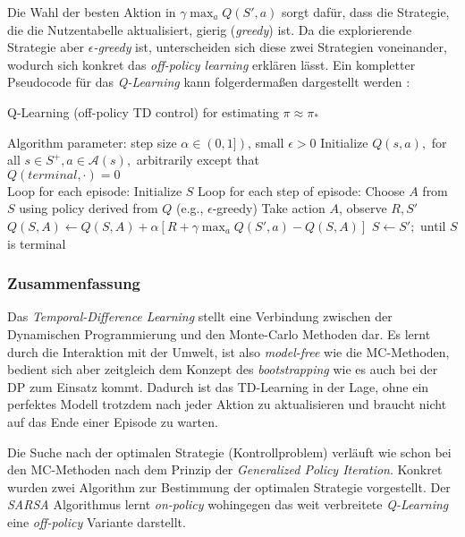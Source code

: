 Die Wahl der besten Aktion in $\gamma \max_a Q(S',a)$ sorgt dafür, dass die Strategie, die die Nutzentabelle aktualisiert, gierig (\textit{greedy}) ist. Da die explorierende Strategie aber $\epsilon$\textit{-greedy} ist, unterscheiden sich diese zwei Strategien voneinander, wodurch sich konkret das \textit{off-policy learning} erklären lässt. Ein kompletter Pseudocode für das \textit{Q-Learning} kann folgerdermaßen dargestellt werden \cite[S.~131]{Sutton1998}:
\begin{algorithm}
    \caption{Q-Learning (off-policy TD control) for estimating $\pi \approx \pi_*$}
    \begin{algorithmic}[1]
        \State Algorithm parameter: step size $\alpha \in (0,1])$, small $\epsilon > 0$
        \State Initialize $Q(s,a),$ for all $s \in S^+, a \in \mathcal{A}(s),$ arbitrarily except that \\ $Q(terminal, \mathord{\cdot}) = 0$
        \\
        \State Loop for each episode:
        \Indent
            \State Initialize $S$
            \State Loop for each step of episode:
            \Indent
                \State Choose $A$ from $S$ using policy derived from $Q$ (e.g., $\epsilon$-greedy)
                \State Take action $A$, observe $R, S'$
                \State $Q(S,A) \gets Q(S,A) + \alpha [R + \gamma \max_a Q(S',a) - Q(S,A)]$
                \State $S \gets S';$
            \EndIndent
            \State until $S$ is terminal
        \EndIndent 
    \end{algorithmic}
\end{algorithm}

\subsubsection{Zusammenfassung}
Das \textit{Temporal-Difference Learning} stellt eine Verbindung zwischen der Dynamischen Programmierung und den Monte-Carlo Methoden dar. Es lernt durch die Interaktion mit der Umwelt, ist also \textit{model-free} wie die MC-Methoden, bedient sich aber zeitgleich dem Konzept des \textit{bootstrapping} wie es auch bei der DP zum Einsatz kommt. Dadurch ist das TD-Learning in der Lage, ohne ein perfektes Modell trotzdem nach jeder Aktion zu aktualisieren und braucht nicht auf das Ende einer Episode zu warten.
\par 
Die Suche nach der optimalen Strategie (Kontrollproblem) verläuft wie schon bei den MC-Methoden nach dem Prinzip der \textit{Generalized Policy Iteration}. Konkret wurden zwei Algorithm zur Bestimmung der optimalen Strategie vorgestellt. Der \textit{SARSA} Algorithmus lernt \textit{on-policy} wohingegen das weit verbreitete \textit{Q-Learning} eine \textit{off-policy} Variante darstellt.